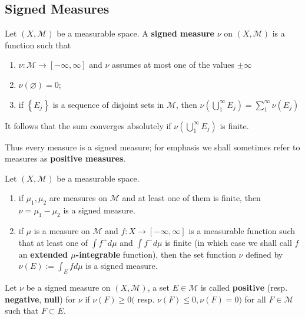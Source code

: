 \documentclass[12pt, a4paper, oneside]{book}
\begin{document}
\subsection{Signed Measures}
\begin{definition}
    Let $\left(X, \mathcal{M}\right)$ be a measurable space.
    A \textbf{signed measure} $\nu$ on $\left(X, \mathcal{M}\right)$ is a function  such that
    \begin{enumerate}[label=(\roman*)]
        \item
              $\nu: \mathcal{M} \rightarrow[-\infty, \infty]$ and $\nu$ assumes at most one of the values $\pm \infty$
        \item
              $\nu(\varnothing)=0$;
        \item
              if $\left\{E_j\right\}$ is a sequence of disjoint sets in $\mathcal{M}$, then $\nu\left(\bigcup_1^{\infty} E_j\right)=\sum_1^{\infty} \nu\left(E_j\right)$
    \end{enumerate}
    \begin{remark}
        It follows that the sum converges absolutely if $\nu\left(\bigcup_1^{\infty} E_j\right)$ is finite.
    \end{remark}
\end{definition}
Thus every measure is a signed measure; for emphasis we shall sometimes refer to measures as \textbf{positive measures}.


\begin{proposition}
    Let $\left(X, \mathcal{M}\right)$ be a measurable space.
    \begin{enumerate}
        \item
              if $\mu_1, \mu_2$ are measures on $\mathcal{M}$ and at least one of them is finite, then $\nu=\mu_1-\mu_2$ is a signed measure.
        \item
              if $\mu$ is a measure on $\mathcal{M}$ and $f: X \rightarrow[-\infty, \infty]$ is a measurable function such that at least one of $\int f^{+} d \mu$ and $\int f^{-} d \mu$ is finite (in which case we shall call $f$ an \textbf{extended $\mu$-integrable} function), then the set function $\nu$ defined by $\nu(E):=\int_E f d \mu$ is a signed measure.
    \end{enumerate}
\end{proposition}
\begin{definition}
    Let $\nu$ be a signed measure on $(X, \mathcal{M})$, a set $E \in \mathcal{M}$ is called \textbf{positive} (resp. \textbf{negative}, \textbf{null}) for $\nu$ if $\nu(F) \geq 0($ resp. $\nu(F) \leq 0, \nu(F)=0)$ for all $F \in \mathcal{M}$ such that $F \subset E$.
\end{definition}
\end{document}
